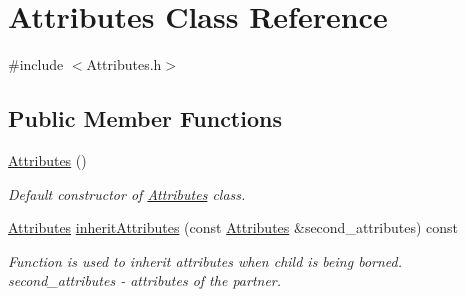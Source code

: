 \hypertarget{class_attributes}{}\section{Attributes Class Reference}
\label{class_attributes}


{\ttfamily \#include $<$Attributes.\+h$>$}

\subsection*{Public Member Functions}
\begin{DoxyCompactItemize}
\item 
\hyperlink{class_attributes_a81480f8fb5fa048f2f7b52f7fa9fd64e}{Attributes} ()
\begin{DoxyCompactList}\small\item\em Default constructor of \hyperlink{class_attributes}{Attributes} class. \end{DoxyCompactList}\item 
\hyperlink{class_attributes}{Attributes} \hyperlink{class_attributes_a69f4faab85246ca504afc6797b22dc4e}{inherit\+Attributes} (const \hyperlink{class_attributes}{Attributes} \&second\+\_\+attributes) const 
\begin{DoxyCompactList}\small\item\em Function is used to inherit attributes when child is being borned.  second\+\_\+attributes -\/ attributes of the partner. \end{DoxyCompactList}\end{DoxyCompactItemize}
